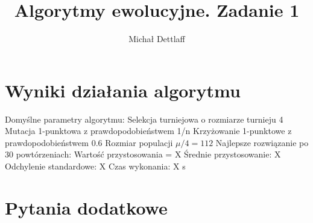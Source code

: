 \documentclass[11pt]{article}
\begin{document}
\title{Algorytmy ewolucyjne. Zadanie 1}
\author{Michał Dettlaff}
\maketitle

\section{Wyniki działania algorytmu}

\noindent
Domyślne parametry algorytmu:\newline
Selekcja turniejowa o rozmiarze turnieju 4\newline
Mutacja 1-punktowa z prawdopodobieństwem 1/n\newline
Krzyżowanie 1-punktowe z prawdopodobieństwem 0.6\newline
Rozmiar populacji $ \mu/4 = 112 $\newline
\newline
Najlepsze rozwiązanie po 30 powtórzeniach:\newline
Wartość przystosowania = X\newline
Średnie przystosowanie: X\newline
Odchylenie standardowe: X\newline
Czas wykonania: X s

\section{Pytania dodatkowe}
\end{document}
